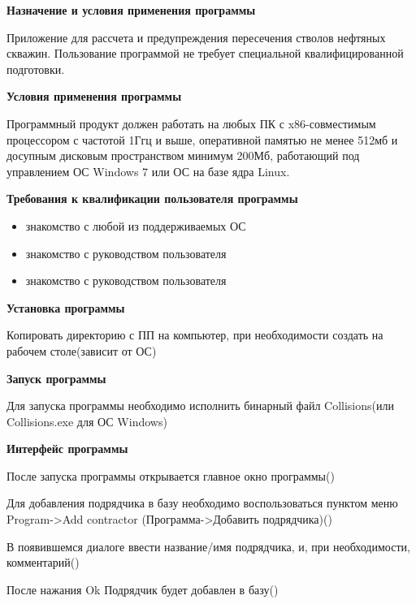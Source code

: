 \textbf{Назначение и условия применения программы}

Приложение для рассчета и предупреждения пересечения стволов нефтяных скважин.
Пользование программой не требует специальной квалифицированной  подготовки.

\textbf{Условия применения программы}

Программный продукт должен работать на любых ПК с x86-совместимым процессором с частотой 1Ггц и выше,
оперативной памятью не менее 512мб и досупным дисковым пространством минимум 200Мб, работающий под
управлением ОС Windows 7 или ОС на базе ядра Linux.

\textbf{Требования к квалификации пользователя программы}

\begin{itemize}
  \item{знакомство с любой из поддерживаемых ОС}
  \item{знакомство с руководством пользователя}
  \item{знакомство с руководством пользователя}
\end{itemize}

\textbf{Установка программы}

Копировать директорию с ПП на компьютер, при необходимости создать на рабочем столе(зависит от ОС)

\textbf{Запуск программы}

Для запуска программы необходимо исполнить бинарный файл Collisions(или Collisions.exe для ОС Windows)

\textbf{Интерфейс программы}

После запуска программы открывается главное окно программы()


Для добавления подрядчика в базу необходимо воспользоваться пунктом меню Program->Add contractor
(Программа->Добавить подрядчика)()


В появившемся диалоге ввести название/имя подрядчика, и, при необходимости, комментарий()


После нажания Ok Подрядчик будет добавлен в базу()

